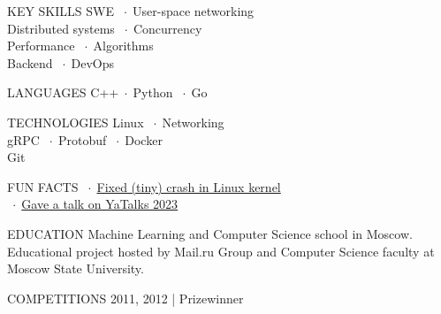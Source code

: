 \documentclass[12pt]{cutecv}
\author{Svyatoslav Feldsherov}
\newcommand{\listbullet}{$\; \cdot \;$}
\begin{document}
\maketitle

\begin{paracol}{2}
\setlength{\columnsep}{2em}
\setlength{\cvsectionverticalskip}{1mm}
\setlength{\cvinfoverticalskip}{1mm}

\begin{leftcolumn}
\begin{cvsection}{KEY SKILLS}
   SWE \listbullet User-space networking  \\
   Distributed systems \listbullet Concurrency  \\
   Performance \listbullet Algorithms \\
   Backend \listbullet DevOps 
\end{cvsection}

\begin{cvsection}{LANGUAGES}
  C++\listbullet Python \listbullet Go
\end{cvsection}

\begin{cvsection}{TECHNOLOGIES}
  Linux \listbullet Networking \\
  gRPC \listbullet Protobuf \listbullet Docker \\
  Git \\
\end{cvsection}

\begin{cvsection}{FUN FACTS}
  \listbullet \href{https://lore.kernel.org/lkml/CACgs1VAo5AD-6sw2QCNKhRtoOy99XNP24dAWUrdryJKhCxwsMA@mail.gmail.com/}{Fixed (tiny) crash in Linux kernel} \\
  \listbullet \href{https://yatalks.yandex.ru/en/speakers/svyatoslav-feldsherov}{Gave a talk on YaTalks 2023} \\
\end{cvsection}

\begin{cvsection}{EDUCATION}
    {Machine Learning and Computer Science school in Moscow.}
   {Educational project hosted
    by Mail.ru Group and Computer Science faculty
    at Moscow State University.}
\end{cvsection}

\begin{cvsection}{COMPETITIONS}
  {2011, 2012 | Prizewinner}
  {}
\end{cvsection}


\end{leftcolumn}
\end{paracol}
\end{document}
